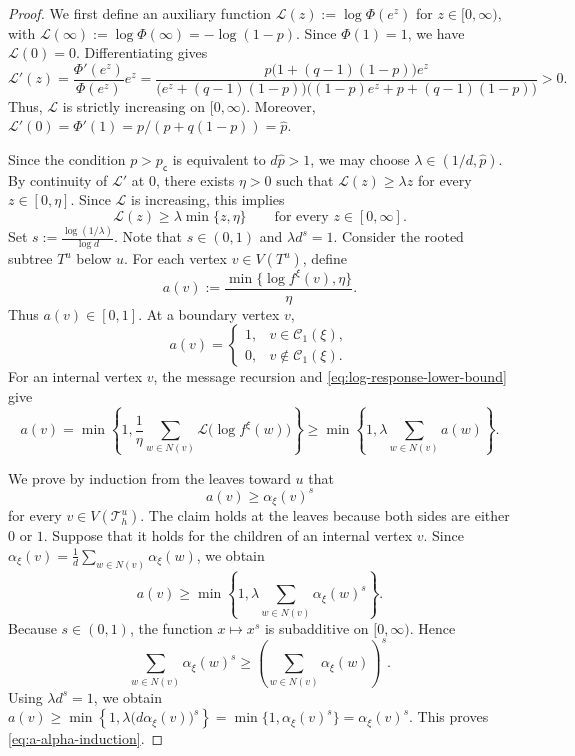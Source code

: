 \documentclass[11pt]{amsart}
\theoremstyle{plain}
\theoremstyle{definition}
\theoremstyle{remark}
\newcommand{\dary}{\mathcal T_h}
\newcommand{\pc}{p_{\mathsf{c}}}
\begin{document}
\begin{proof}
We first define an auxiliary function $\mathcal L(z):=\log\Phi(e^z)$ for $z\in[0,\infty)$, with $\mathcal L(\infty):=\log\Phi(\infty)=-\log(1-p).$ Since $\Phi(1)=1$, we have $\mathcal L(0)=0$. Differentiating gives
\[
    \mathcal L'(z)
    =
    \frac{\Phi'(e^z)}
    {\Phi(e^z)}
     e^z
    =
    \frac{p\bigl(1+(q-1)(1-p)\bigr)e^z}
    {\bigl(e^z+(q-1)(1-p)\bigr)
     \bigl((1-p)e^z+p+(q-1)(1-p)\bigr)}
    >0.
\]
Thus, $\mathcal L$ is strictly increasing on $[0,\infty)$. Moreover, $\mathcal L'(0)=\Phi'(1)=p/(p+q(1-p))=\widehat p$.

Since the condition $p>\pc$ is equivalent to $d\widehat p>1$, we may choose $\lambda\in\left(1/d,\widehat p\right)$. By continuity of $\mathcal L'$ at $0$, there exists $\eta>0$ such that $\mathcal L(z)\ge\lambda z$ for every $z\in[0,\eta]$. Since $\mathcal L$ is increasing, this implies
\begin{equation}
\label{eq:log-response-lower-bound}
    \mathcal L(z)
    \ge
    \lambda\min\{z,\eta\}
    \qquad
    \text{for every }z\in[0,\infty].
\end{equation}
Set $s:=\frac{\log(1/\lambda)}{\log d}$. Note that $s\in(0,1)$ and $\lambda d^s=1$. Consider the rooted subtree $T^u$ below $u$. For each vertex $v\in V(T^u)$, define
\[
    a(v)
    :=
    \frac{
        \min\{\log f^\xi(v),\eta\}
    }{\eta}.
\]
Thus $a(v)\in[0,1]$. At a boundary vertex $v$,
\[
    a(v)
    =
    \begin{cases}
        1, & v\in\mathcal C_1(\xi),\\
        0, & v\notin\mathcal C_1(\xi).
    \end{cases}
\]
For an internal vertex $v$, the message recursion and \eqref{eq:log-response-lower-bound} give
\[
    a(v)
    =
    \min\left\{
        1,
        \frac1\eta
        \sum_{w\in N(v)}
        \mathcal L\bigl(\log f^\xi(w)\bigr)
    \right\}
    \ge
    \min\left\{
        1,
        \lambda
        \sum_{w\in N(v)}a(w)
    \right\}.
\]

We prove by induction from the leaves toward $u$ that
\begin{equation}
\label{eq:a-alpha-induction}
    a(v)\ge\alpha_\xi(v)^s
\end{equation}
for every $v\in V(\dary^u)$. The claim holds at the leaves because both sides are either $0$ or $1$. Suppose that it holds for the children of an internal vertex $v$. Since $\alpha_\xi(v)=\frac1d\sum\limits_{w\in N(v)}\alpha_\xi(w)$, we obtain
\[
    a(v)
    \ge
    \min\left\{
        1,
        \lambda
        \sum_{w\in N(v)}
        \alpha_\xi(w)^s
    \right\}.
\]
Because $s\in(0,1)$, the function $x\mapsto x^s$ is subadditive on
$[0,\infty)$. Hence
\[
    \sum_{w\in N(v)}
    \alpha_\xi(w)^s
    \ge
    \left(
        \sum_{w\in N(v)}
        \alpha_\xi(w)
    \right)^s.
\]
Using $\lambda d^s=1$, we obtain $a(v)\ge\min\left\{1,\lambda\bigl(d\alpha_\xi(v)\bigr)^s\right\}=\min\{1,\alpha_\xi(v)^s\}=\alpha_\xi(v)^s$. This proves \eqref{eq:a-alpha-induction}.


\end{proof}
\end{document}
